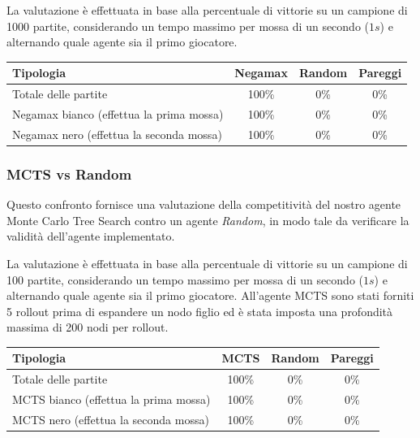 \documentclass[a4paper,12pt]{article}
\begin{document}
    La valutazione è effettuata in base alla percentuale di vittorie su un campione di 1000 partite, considerando un tempo massimo per mossa di un secondo ($1s$) e alternando quale agente sia il primo giocatore.

    \begin{table}[h]
        \begin{center}
            \begin{tabular}{||l|c|c|c||}
                \hline
                Tipologia                                & Negamax & Random & Pareggi \\ \hline
                Totale delle partite                     & 100\%   & 0\%    & 0\%     \\
                Negamax bianco (effettua la prima mossa) & 100\%   & 0\%    & 0\%     \\
                Negamax nero (effettua la seconda mossa) & 100\%   & 0\%    & 0\%     \\ \hline
            \end{tabular}
        \end{center}
    \end{table}

    \subsubsection{MCTS vs Random}
    Questo confronto fornisce una valutazione della competitività del nostro agente Monte Carlo Tree Search contro un agente \textit{Random}, in modo tale da verificare la validità dell'agente implementato.

    La valutazione è effettuata in base alla percentuale di vittorie su un campione di 100 partite, considerando un tempo massimo per mossa di un secondo ($1s$) e alternando quale agente sia il primo giocatore. All'agente MCTS sono stati forniti 5 rollout prima di espandere un nodo figlio ed è stata imposta una profondità massima di 200 nodi per rollout.

    \begin{table}[h]
        \begin{center}
            \begin{tabular}{||l|c|c|c||}
                \hline
                Tipologia                             & MCTS  & Random & Pareggi \\ \hline
                Totale delle partite                  & 100\% & 0\%    & 0\%     \\
                MCTS bianco (effettua la prima mossa) & 100\% & 0\%    & 0\%     \\
                MCTS nero (effettua la seconda mossa) & 100\% & 0\%    & 0\%     \\ \hline
            \end{tabular}
        \end{center}
    \end{table}
\end{document}
